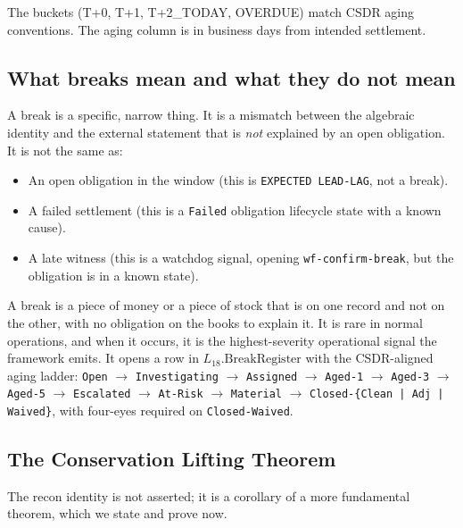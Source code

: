 \documentclass[11pt,a4paper]{article}
\begin{document}
The buckets (T+0, T+1, T+2\_TODAY, OVERDUE) match CSDR aging conventions. The aging column is in business days from intended settlement.

\subsection{What breaks mean and what they do not mean}
\label{sec:reconciliation-breaks}

A break is a specific, narrow thing. It is a mismatch between the algebraic identity and the external statement that is \emph{not} explained by an open obligation. It is not the same as:

\begin{itemize}[nosep]
\item An open obligation in the window (this is \texttt{EXPECTED LEAD-LAG}, not a break).
\item A failed settlement (this is a \texttt{Failed} obligation lifecycle state with a known cause).
\item A late witness (this is a watchdog signal, opening \texttt{wf-confirm-break}, but the obligation is in a known state).
\end{itemize}

A break is a piece of money or a piece of stock that is on one record and not on the other, with no obligation on the books to explain it. It is rare in normal operations, and when it occurs, it is the highest-severity operational signal the framework emits. It opens a row in $L_{18}.\mathrm{BreakRegister}$ with the CSDR-aligned aging ladder: \texttt{Open} $\to$ \texttt{Investigating} $\to$ \texttt{Assigned} $\to$ \texttt{Aged-1} $\to$ \texttt{Aged-3} $\to$ \texttt{Aged-5} $\to$ \texttt{Escalated} $\to$ \texttt{At-Risk} $\to$ \texttt{Material} $\to$ \texttt{Closed-\{Clean | Adj | Waived\}}, with four-eyes required on \texttt{Closed-Waived}.

\subsection{The Conservation Lifting Theorem}
\label{sec:conservation-lifting}

The recon identity is not asserted; it is a corollary of a more fundamental theorem, which we state and prove now.
\end{document}
